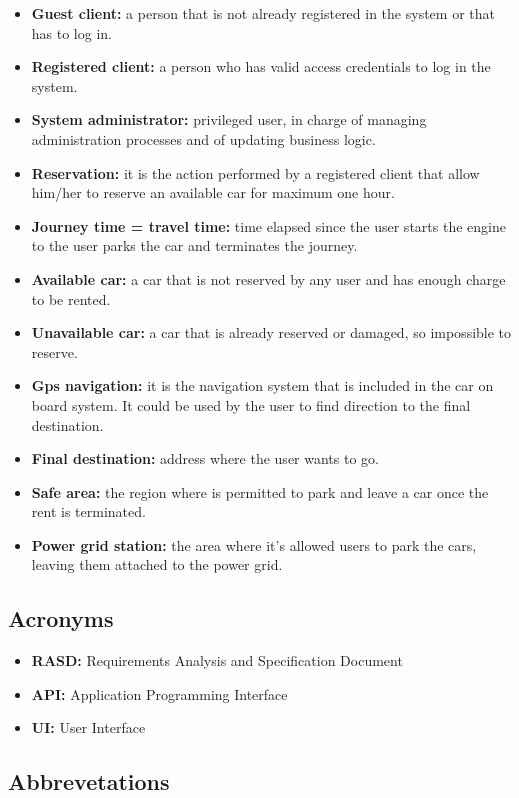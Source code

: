 \begin{itemize}
\item \textbf{Guest client:} a person that is not already registered in the system or that has to log in.
\item \textbf{Registered client:} a person who has valid access credentials to log in the system.
\item \textbf{System administrator:} privileged user, in charge of managing administration processes and of updating business logic.
\item \textbf{Reservation:} it is the action performed by a registered client that allow him/her to reserve an available car for maximum one hour.
\item \textbf{Journey time = travel time:} time elapsed since the user starts the engine to the user parks the car and terminates the journey.
\item \textbf{Available car:} a car that is not reserved by any user and has enough charge to be rented.
\item \textbf{Unavailable car:} a car that is already reserved or damaged, so impossible to reserve.
\item \textbf{Gps navigation:} it is the navigation system that is included in the car on board system. It could be used by the user to find direction to the final destination.
\item \textbf{Final destination:} address where the user wants to go.
\item \textbf{Safe area:} the region where is permitted to park and leave a car once the rent is terminated.
\item \textbf{Power grid station:} the area where it’s allowed users to park the cars, leaving them attached to the power grid.
\end{itemize}

\subsection{Acronyms}

\begin{itemize}
\item \textbf{RASD:} Requirements Analysis and Specification Document
\item \textbf{API:} Application Programming Interface
\item \textbf{UI:} User Interface
\end{itemize}

\subsection{Abbrevetations}

